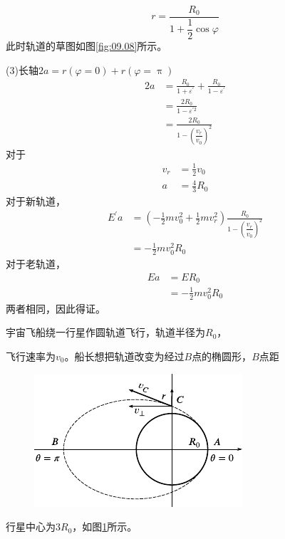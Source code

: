 \begin{equation*}
  r = \frac { R _ { 0 } } { 1 + \dfrac { 1 } { 2 } \cos \varphi }
\end{equation*}
此时轨道的草图如图\ref{fig:09.08}所示。

(3)长轴$ 2 a = r \left( \varphi = 0 \right) + r \left( \varphi = \uppi \right) $
\begin{equation*}
  \begin{split}
    2 a &= \frac { R _ { 0 } } { 1 + \varepsilon ^ { \prime } } + \frac { R _ { 0 } } { 1 - \varepsilon ^ { \prime } }  \\
    &= \frac { 2 R _ { 0 } } { 1 - \varepsilon ^ { \prime 2 } } \\
    &= \frac { 2 R _ { 0 } } { 1 - \left( \dfrac { v _ { r } } { v _ { 0 } } \right) ^ { 2 }}
  \end{split}
\end{equation*}
对于\vspace{-0.6em}
\begin{align*}
  v _ { r } & = \frac { 1 } { 2 } v _ { 0 } \\
  a         & = \frac { 4 } { 3 } R _ { 0 }
\end{align*}
对于新轨道，
\begin{equation*}
  \begin{split}
    E^{\prime} a &=\left(-\frac{1}{2} m v_{0}^{2}+\frac{1}{2} m v_{r}^{2}\right) \frac{R_{0}}{1-\left(\dfrac{v_{r}}{v_{0}}\right)^{2}} \\
    &=-\frac{1}{2} m v_{0}^{2} R_{0}
  \end{split}
\end{equation*}
对于老轨道，
\begin{equation*}
  \begin{split}
    E a &= E R _ { 0 } \\
    &= - \frac { 1 } { 2 } m v _ 0 ^ { 2 } R _ { 0 }
  \end{split}
\end{equation*}
两者相同，因此得证。


\example 宇宙飞船绕一行星作圆轨道飞行，轨道半径为$ R _ 0 $，

\clearpage\noindent 飞行速率为$ v _ { 0 } $。船长想把轨道改变为经过$ B $点的椭圆形，$ B $点距
\begin{figure}
  \centering
  \includegraphics{figure/fig09.09}
  \caption{}
  \label{fig:09.09}
\end{figure}
行星中心为$ 3 R _ { 0 } $，如图\ref{fig:09.09}所示。

